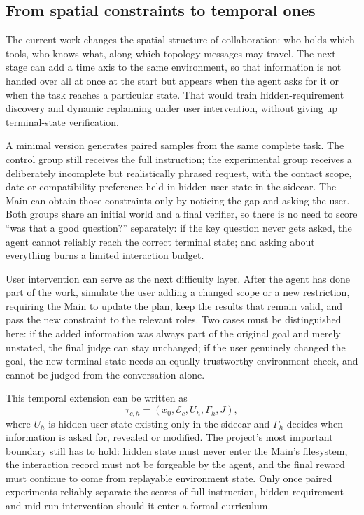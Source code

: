 \documentclass[11pt,a4paper]{article}
\begin{document}
\subsection{From spatial constraints to temporal ones}

The current work changes the spatial structure of collaboration: who holds which tools, who knows what, along which topology messages may travel. The next stage can add a time axis to the same environment, so that information is not handed over all at once at the start but appears when the agent asks for it or when the task reaches a particular state. That would train hidden-requirement discovery and dynamic replanning under user intervention, without giving up terminal-state verification.

A minimal version generates paired samples from the same complete task. The control group still receives the full instruction; the experimental group receives a deliberately incomplete but realistically phrased request, with the contact scope, date or compatibility preference held in hidden user state in the sidecar. The Main can obtain those constraints only by noticing the gap and asking the user. Both groups share an initial world and a final verifier, so there is no need to score ``was that a good question?'' separately: if the key question never gets asked, the agent cannot reliably reach the correct terminal state; and asking about everything burns a limited interaction budget.

User intervention can serve as the next difficulty layer. After the agent has done part of the work, simulate the user adding a changed scope or a new restriction, requiring the Main to update the plan, keep the results that remain valid, and pass the new constraint to the relevant roles. Two cases must be distinguished here: if the added information was always part of the original goal and merely unstated, the final judge can stay unchanged; if the user genuinely changed the goal, the new terminal state needs an equally trustworthy environment check, and cannot be judged from the conversation alone.

This temporal extension can be written as
\[
  \tau_{c,h}=(x_0,\mathcal{E}_c,U_h,\Gamma_h,J),
\]
where $U_h$ is hidden user state existing only in the sidecar and $\Gamma_h$ decides when information is asked for, revealed or modified. The project's most important boundary still has to hold: hidden state must never enter the Main's filesystem, the interaction record must not be forgeable by the agent, and the final reward must continue to come from replayable environment state. Only once paired experiments reliably separate the scores of full instruction, hidden requirement and mid-run intervention should it enter a formal curriculum.
\end{document}
